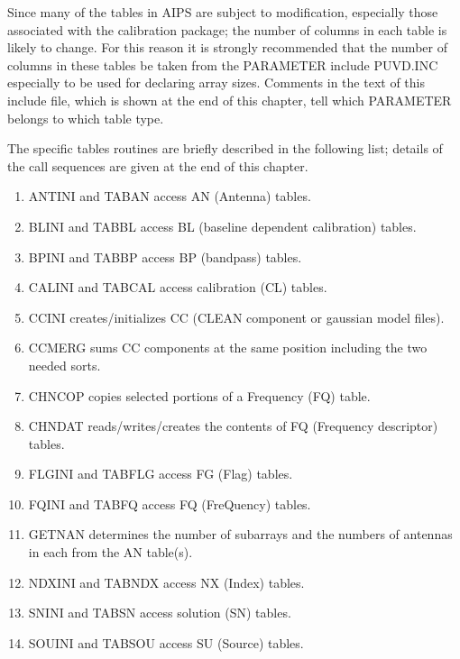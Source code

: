    Since many of the tables in AIPS are subject to modification,
especially those associated with the calibration package; the number
of columns in each table is likely to change.  For this reason it is
strongly recommended that the number of columns in these tables be
taken from the PARAMETER include PUVD.INC especially
to be used for declaring array sizes.  Comments in the text of this
include file, which is shown at the end of this chapter, tell which
PARAMETER belongs to which table type.

  The specific tables routines are briefly described in the following list;
details of the call sequences are given at the end of this chapter.
\begin{enumerate} %
\item ANTINI and TABAN access AN (Antenna)
tables.
\item BLINI and TABBL access BL (baseline
dependent calibration) tables.
\item BPINI and TABBP access BP (bandpass) tables.
\item CALINI and TABCAL access calibration
(CL) tables.
\item CCINI creates/initializes CC (CLEAN component or
gaussian model files).
\item CCMERG sums CC components at the same position
including the two needed sorts.
\item CHNCOP copies selected portions of a Frequency (FQ) table.
\item CHNDAT reads/writes/creates the contents of FQ
(Frequency descriptor) tables.
\item FLGINI and TABFLG access FG (Flag) tables.
\item FQINI and TABFQ access FQ (FreQuency) tables.
\item GETNAN determines the number of subarrays and the
numbers of antennas in each from the AN table(s).
\item NDXINI and TABNDX access NX (Index) tables.
\item SNINI and TABSN access solution (SN) tables.
\item SOUINI and TABSOU access SU (Source) tables.

\end{enumerate} %

